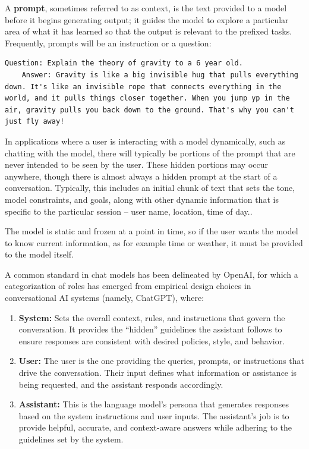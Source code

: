 A \textbf{prompt}, sometimes referred to as context, is the text provided to a model before it begins generating output; it guides the model to explore a particular area of what it has learned so that the output is relevant to the prefixed tasks. Frequently, prompts will be an instruction or a question:

\begin{Verbatim}[breaklines=true]
    Question: Explain the theory of gravity to a 6 year old.
    Answer: Gravity is like a big invisible hug that pulls everything down. It's like an invisible rope that connects everything in the world, and it pulls things closer together. When you jump yp in the air, gravity pulls you back down to the ground. That's why you can't just fly away!
\end{Verbatim}


In applications where a user is interacting with a model dynamically, such as chatting with the model, there will typically be portions of the prompt that are never intended to be seen by the user. These hidden portions may occur anywhere, though there is almost always a hidden prompt at the start of a conversation.
Typically, this includes an initial chunk of text that sets the tone, model constraints, and goals, along with other dynamic information that is specific to the particular session – user name, location, time of day..

The model is static and frozen at a point in time, so if the user wants the model to know current information, as for example time or weather, it must be provided to the model itself.

A common standard in chat models has been delineated by OpenAI, for which a categorization of roles has emerged from empirical design choices in conversational AI systems (namely, ChatGPT), where:

\begin{enumerate}
    \item \textbf{System:} Sets the overall context, rules, and instructions that govern the conversation. It provides the “hidden” guidelines the assistant follows to ensure responses are consistent with desired policies, style, and behavior.
    \item \textbf{User:} The user is the one providing the queries, prompts, or instructions that drive the conversation. Their input defines what information or assistance is being requested, and the assistant responds accordingly.
    \item \textbf{Assistant:} This is the language model’s persona that generates responses based on the system instructions and user inputs. The assistant’s job is to provide helpful, accurate, and context-aware answers while adhering to the guidelines set by the system.
\end{enumerate}

